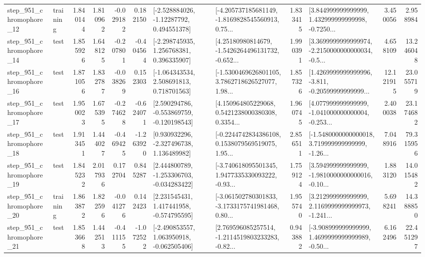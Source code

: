 \begin{tabular}{llrrrrllrlrr}
  step\_951\_chromophore\_12 &  training &      1.840144 &    1.810962 &     -0.029182 &  0.182150 &    [-2.528884026, -1.12287792, 0.494551378] &  [-4.205737185681149, -1.8169828545560913, 0.75... &       1.833415 &  [3.844999999999999, 1.432999999999998, -0.7250... &            3.450056 &          2.958984 \\
  step\_951\_chromophore\_14 &      test &      1.855926 &    1.648125 &     -0.207801 & -0.404564 &    [-2.298745935, 1.256768381, 0.396335907] &  [4.25180980814679, -1.5426264496131732, -0.652... &       1.990391 &  [3.3699999999999974, -2.2150000000000034, -0.5... &            4.658109 &         13.246048 \\
  step\_951\_chromophore\_16 &      test &      1.871056 &    1.832787 &     -0.038269 &  0.152303 &    [-1.064343534, 2.508691813, 0.718701563] &  [-1.5300469626801105, 3.7862718626527077, 1.98... &       1.857326 &  [1.4269999999999996, -3.811, -0.20599999999999... &           12.121915 &         23.055719 \\
  step\_951\_chromophore\_17 &      test &      1.950023 &    1.675395 &     -0.274628 & -0.624071 &   [2.590294786, -0.553869759, -0.120198543] &  [4.150964805229068, 0.5421238000380308, 0.3354... &       1.960745 &  [4.077999999999999, -1.041000000000004, -0.253... &            2.400038 &         23.174682 \\
  step\_951\_chromophore\_18 &      test &      1.913451 &    1.444027 &     -0.469425 & -1.263920 &    [0.930932296, -2.327496738, 1.136489982] &  [-0.2244742834386108, 0.1538079569519075, 1.95... &       2.856511 &  [-1.5480000000000018, 3.719999999999999, -1.26... &            7.048916 &         79.315956 \\
  step\_951\_chromophore\_19 &      test &      1.845232 &    2.017936 &      0.172704 &  0.845287 &   [2.444800789, -1.253306703, -0.034283422] &  [-3.740618095501345, 1.9477335330093222, -0.93... &       1.759124 &  [3.594999999999999, -1.9810000000000016, -0.10... &            1.883120 &         14.015482 \\
  step\_951\_chromophore\_20 &  training &      1.863872 &    1.822596 &     -0.041276 &  0.142423 &    [2.231545431, 1.417441958, -0.574795595] &  [-3.061502780301833, -3.1733175741981468, 0.80... &       1.955740 &  [3.212999999999999, 2.1169999999999973, -1.241... &            5.698241 &         14.388850 \\
  step\_951\_chromophore\_21 &      test &      1.853668 &    1.442513 &     -0.411155 & -1.072522 &   [-2.490853557, 1.063950918, -0.062505406] &  [2.769596085257514, -1.2114519803233283, -0.82... &       0.943882 &  [-3.908999999999999, 1.4699999999999989, -0.50... &            6.162496 &         22.451297 \\

\end{tabular}
